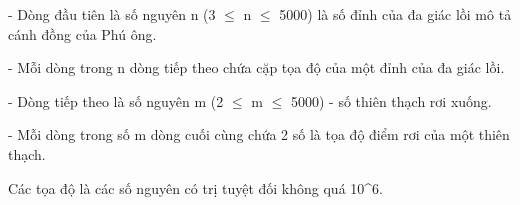 - Dòng đầu tiên là số nguyên n (3  $\le$  n  $\le$  5000) là số đỉnh của đa giác lồi mô tả cánh đồng của Phú ông.   


   - Mỗi dòng trong n dòng tiếp theo chứa cặp tọa độ của một đỉnh của đa giác lồi.   


   - Dòng tiếp theo là số nguyên m (2  $\le$  m  $\le$  5000) - số thiên thạch rơi xuống.   


   - Mỗi dòng trong số m dòng cuối cùng chứa 2 số là tọa độ điểm rơi của một thiên thạch.   


   Các tọa độ là các số nguyên có trị tuyệt đối không quá 10^6.